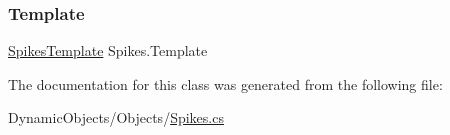\mbox{\label{class_spikes_a512fac8ac510d9997be29bd342f9a176}} 
\subsubsection{\texorpdfstring{Template}{Template}}
{\footnotesize\ttfamily \mbox{\hyperlink{class_spikes_template}{Spikes\+Template}} Spikes.\+Template\hspace{0.3cm}{\ttfamily [get]}}



The documentation for this class was generated from the following file\+:\begin{DoxyCompactItemize}
\item 
Dynamic\+Objects/\+Objects/\mbox{\hyperlink{_spikes_8cs}{Spikes.\+cs}}\end{DoxyCompactItemize}
